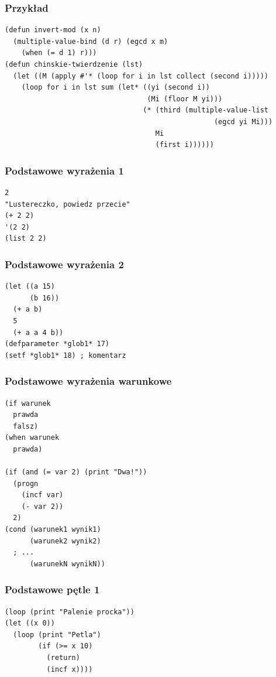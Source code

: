\documentclass{beamer}
\begin{document}
\begin{frame}[fragile]
	\frametitle{Przykład}
	{\scriptsize \begin{lstlisting}
(defun invert-mod (x n)
  (multiple-value-bind (d r) (egcd x m)
    (when (= d 1) r)))
(defun chinskie-twierdzenie (lst)
  (let ((M (apply #'* (loop for i in lst collect (second i)))))
    (loop for i in lst sum (let* ((yi (second i))
                                  (Mi (floor M yi)))
                                 (* (third (multiple-value-list
                                                  (egcd yi Mi)))
                                    Mi
                                    (first i))))))
	\end{lstlisting}}
\end{frame}

\begin{frame}[fragile]
	\frametitle{Podstawowe wyrażenia 1}
	{\scriptsize \begin{lstlisting}
2
"Lustereczko, powiedz przecie"
(+ 2 2)
'(2 2)
(list 2 2)
\end{lstlisting}}
\end{frame}

\begin{frame}[fragile]
	\frametitle{Podstawowe wyrażenia 2}
	{\scriptsize \begin{lstlisting}
(let ((a 15)
      (b 16))
  (+ a b)
  5
  (+ a a 4 b))
(defparameter *glob1* 17)
(setf *glob1* 18) ; komentarz
\end{lstlisting}}
\end{frame}

\begin{frame}[fragile]
	\frametitle{Podstawowe wyrażenia warunkowe}
	{\scriptsize \begin{lstlisting}
(if warunek
  prawda
  falsz)
(when warunek
  prawda)

(if (and (= var 2) (print "Dwa!"))
  (progn
    (incf var)
    (- var 2))
  2)
(cond (warunek1 wynik1)
      (warunek2 wynik2)
  ; ...
      (warunekN wynikN))
\end{lstlisting}}
\end{frame}

\begin{frame}[fragile]
	\frametitle{Podstawowe pętle 1}
	{\scriptsize \begin{lstlisting}
(loop (print "Palenie procka"))
(let ((x 0))
  (loop (print "Petla")
        (if (>= x 10)
          (return)
          (incf x))))
\end{lstlisting}}
\end{frame}
\end{document}
